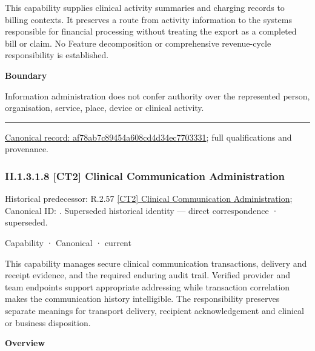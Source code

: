 This capability supplies clinical activity summaries and charging records to billing contexts. It preserves a route from activity information to the systems responsible for financial processing without treating the export as a completed bill or claim. No Feature decomposition or comprehensive revenue-cycle responsibility is established.



\textbf{Boundary}



Information administration does not confer authority over the represented person, organisation, service, place, device or clinical activity.



\medskip\hrule\medskip

{\footnotesize \href{../../../../continuum/strategy/capability/af78ab7c89454a608cd4d34ec7703331.md}{Canonical record: af78ab7c89454a608cd4d34ec7703331}; full qualifications and provenance.}\par
\subsubsection*{II.1.3.1.8 [CT2] Clinical Communication Administration}
\label{navigation:II.1.3.1.8}

{\small Historical predecessor: R.2.57 \hyperref[element:bd4d6f4a7f03402ba7857383c7be7a4c]{[CT2] Clinical Communication Administration}; Canonical ID: \texttt{}. Superseded historical identity — direct correspondence · superseded.}\par
\label{element:b38f2c2811724734b5887b6dbaaabbfc}
{\small Capability · Canonical · current}\par

This capability manages secure clinical communication transactions, delivery and receipt evidence, and the required enduring audit trail. Verified provider and team endpoints support appropriate addressing while transaction correlation makes the communication history intelligible. The responsibility preserves separate meanings for transport delivery, recipient acknowledgement and clinical or business disposition.



\textbf{Overview}



